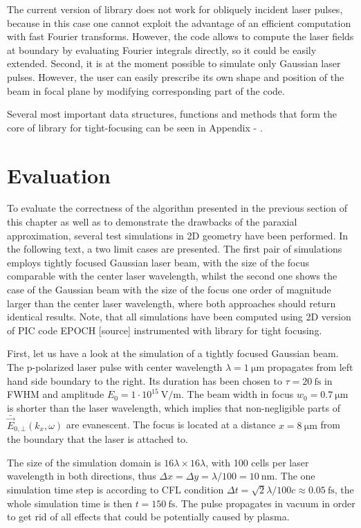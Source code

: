 The current version of library does not work for obliquely incident laser pulses, because in this case one cannot exploit the advantage of an efficient computation with fast Fourier transforms. However, the code allows to compute the laser fields at boundary by evaluating Fourier integrals directly, so it could be easily extended. Second, it is at the moment possible to simulate only Gaussian laser pulses. However, the user can easily prescribe its own shape and position of the beam in focal plane by modifying corresponding part of the code.

Several most important data structures, functions and methods that form the core of library for tight-focusing can be seen in Appendix - .

\section{Evaluation}

To evaluate the correctness of the algorithm presented in the previous section of this chapter as well as to demonstrate the drawbacks of the paraxial approximation, several test simulations in 2D geometry have been performed. In the following text, a two limit cases are presented. The first pair of simulations employs tightly focused Gaussian laser beam, with the size of the focus comparable with the center laser wavelength, whilst the second one shows the case of the Gaussian beam with the size of the focus one order of magnitude larger than the center laser wavelength, where both approaches should return identical results. Note, that all simulations have been computed using 2D version of PIC code EPOCH [source] instrumented with library for tight focusing.

First, let us have a look at the simulation of a tightly focused Gaussian beam. The p-polarized laser pulse with center wavelength $ \lambda = 1 \: \mathrm{\mu m} $ propagates from left hand side boundary to the right. Its duration has been chosen to $ \tau = 20 \: \mathrm{fs} $ in FWHM and amplitude $ E_0 = 1 \cdot 10^{15} \: \mathrm{V/m} $. The beam width in focus $ w_0 = 0.7 \: \mathrm{\mu m} $ is shorter than the laser wavelength, which implies that non-negligible parts of $ \bar{\vec{E}}_{0, \bot}(k_x, \omega) $ are evanescent. The focus is located at a distance $ x = 8 \: \mathrm{\mu m} $ from the boundary that the laser is attached to.

The size of the simulation domain is $ 16 \lambda \times 16 \lambda $, with 100 cells per laser wavelength in both directions, thus $ \Delta x = \Delta y = \lambda/100 = 10 \: \mathrm{nm} $. The one simulation time step is according to CFL condition $ \Delta t = \sqrt{2} \lambda/ 100 c \approx 0.05 \: \mathrm{fs} $, the whole simulation time is then $ t = 150 \: \mathrm{fs} $. The pulse propagates in vacuum in order to get rid of all effects that could be potentially caused by plasma.

